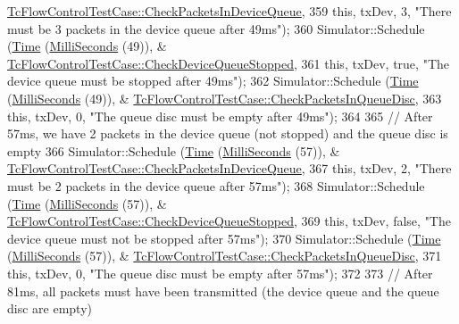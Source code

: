 \begin{DoxyCode}
      \hyperlink{classTcFlowControlTestCase_a7ad467b39fdb155daea4b048619f6d12}{TcFlowControlTestCase::CheckPacketsInDeviceQueue},
359                           \textcolor{keyword}{this}, txDev, 3, \textcolor{stringliteral}{"There must be 3 packets in the device queue after 49ms"});
360       Simulator::Schedule (\hyperlink{classns3_1_1Time}{Time} (\hyperlink{group__timecivil_gaf26127cf4571146b83a92ee18679c7a9}{MilliSeconds} (49)), &
      \hyperlink{classTcFlowControlTestCase_a4ccc9564c9142984fa8041f67b4a518a}{TcFlowControlTestCase::CheckDeviceQueueStopped},
361                           \textcolor{keyword}{this}, txDev, \textcolor{keyword}{true}, \textcolor{stringliteral}{"The device queue must be stopped after 49ms"});
362       Simulator::Schedule (\hyperlink{classns3_1_1Time}{Time} (\hyperlink{group__timecivil_gaf26127cf4571146b83a92ee18679c7a9}{MilliSeconds} (49)), &
      \hyperlink{classTcFlowControlTestCase_ac6d0b6a74dd29a21369bf1d26795098d}{TcFlowControlTestCase::CheckPacketsInQueueDisc},
363                           \textcolor{keyword}{this}, txDev, 0, \textcolor{stringliteral}{"The queue disc must be empty after 49ms"});
364 
365       \textcolor{comment}{// After 57ms, we have 2 packets in the device queue (not stopped) and the queue disc is empty}
366       Simulator::Schedule (\hyperlink{classns3_1_1Time}{Time} (\hyperlink{group__timecivil_gaf26127cf4571146b83a92ee18679c7a9}{MilliSeconds} (57)), &
      \hyperlink{classTcFlowControlTestCase_a7ad467b39fdb155daea4b048619f6d12}{TcFlowControlTestCase::CheckPacketsInDeviceQueue},
367                           \textcolor{keyword}{this}, txDev, 2, \textcolor{stringliteral}{"There must be 2 packets in the device queue after 57ms"});
368       Simulator::Schedule (\hyperlink{classns3_1_1Time}{Time} (\hyperlink{group__timecivil_gaf26127cf4571146b83a92ee18679c7a9}{MilliSeconds} (57)), &
      \hyperlink{classTcFlowControlTestCase_a4ccc9564c9142984fa8041f67b4a518a}{TcFlowControlTestCase::CheckDeviceQueueStopped},
369                           \textcolor{keyword}{this}, txDev, \textcolor{keyword}{false}, \textcolor{stringliteral}{"The device queue must not be stopped after 57ms"});
370       Simulator::Schedule (\hyperlink{classns3_1_1Time}{Time} (\hyperlink{group__timecivil_gaf26127cf4571146b83a92ee18679c7a9}{MilliSeconds} (57)), &
      \hyperlink{classTcFlowControlTestCase_ac6d0b6a74dd29a21369bf1d26795098d}{TcFlowControlTestCase::CheckPacketsInQueueDisc},
371                           \textcolor{keyword}{this}, txDev, 0, \textcolor{stringliteral}{"The queue disc must be empty after 57ms"});
372 
373       \textcolor{comment}{// After 81ms, all packets must have been transmitted (the device queue and the queue disc are empty)}

\end{DoxyCode}
